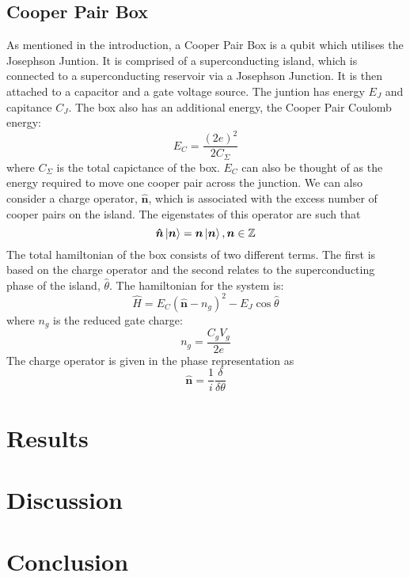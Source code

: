 \documentclass[11pt]{article}
\begin{document}
   \subsection{Cooper Pair Box}
   As mentioned in the introduction, a Cooper Pair Box is a qubit which utilises the Josephson Juntion. It is comprised of a superconducting island, which is connected to a superconducting reservoir via a Josephson Junction. It is then attached to a capacitor and a gate voltage source. The juntion has energy $E_J$ and capitance $C_J$. The box also has an additional energy, the Cooper Pair Coulomb energy:
	\begin{equation}
	E_C =  \frac{(2e)^2}{2C_\Sigma}
	\end{equation}
	where $C_\Sigma$ is the total capictance of the box. $E_C$ can also be thought of as the energy required to move one cooper pair across the junction. We can also consider a charge operator, $\boldsymbol{\hat{n}}$, which is associated with the excess number of cooper pairs on the island. The eigenstates of this operator are such that
	\begin{equation}
	\boldsymbol{\hat{n}}\ket{\boldsymbol{n}} = \boldsymbol{n}\ket{\boldsymbol{n}},  \boldsymbol{n} \in \mathbb{Z}
	\end{equation}
The total hamiltonian of the box consists of two different terms. The first is based on the charge operator and the second relates to the superconducting phase of the island, $\hat{\theta}$. The hamiltonian for the system is:
	\begin{equation}
	\hat{H} = E_C (\boldsymbol{\hat{n}} - n_g)^2 - E_J \cos{\hat{\theta}}
	\end{equation}
where $n_g$ is the reduced gate charge:
	\begin{equation}
	n_g = \frac{C_g V_g}{2e}
	\end{equation}
The charge operator is given in the phase representation as
	\begin{equation}
	\boldsymbol{\hat{n}} = \frac{1}{i} \frac{\delta}{\delta\theta}
	\end{equation}


    \section{Results}

    \section{Discussion}

    \section{Conclusion}
\end{document}
